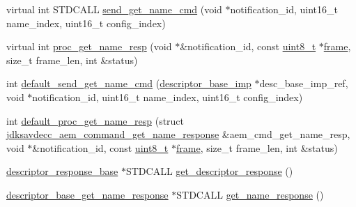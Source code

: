 \begin{DoxyCompactItemize}
virtual int S\+T\+D\+C\+A\+LL \hyperlink{classavdecc__lib_1_1descriptor__base__imp_a4e8ce103baabbd5fc07deabfb95f791a}{send\+\_\+get\+\_\+name\+\_\+cmd} (void $\ast$notification\+\_\+id, uint16\+\_\+t name\+\_\+index, uint16\+\_\+t config\+\_\+index)
\item 
virtual int \hyperlink{classavdecc__lib_1_1descriptor__base__imp_ac4e290a88039a8e4915f7b9f8738881f}{proc\+\_\+get\+\_\+name\+\_\+resp} (void $\ast$\&notification\+\_\+id, const \hyperlink{stdint_8h_aba7bc1797add20fe3efdf37ced1182c5}{uint8\+\_\+t} $\ast$\hyperlink{gst__avb__playbin_8c_ac8e710e0b5e994c0545d75d69868c6f0}{frame}, size\+\_\+t frame\+\_\+len, int \&status)
\item 
int \hyperlink{classavdecc__lib_1_1descriptor__base__imp_a92f2c88d261418872a496a8145800751}{default\+\_\+send\+\_\+get\+\_\+name\+\_\+cmd} (\hyperlink{classavdecc__lib_1_1descriptor__base__imp}{descriptor\+\_\+base\+\_\+imp} $\ast$desc\+\_\+base\+\_\+imp\+\_\+ref, void $\ast$notification\+\_\+id, uint16\+\_\+t name\+\_\+index, uint16\+\_\+t config\+\_\+index)
\item 
int \hyperlink{classavdecc__lib_1_1descriptor__base__imp_acc8b1c1591bd54bc9a2d21d4f0db2e86}{default\+\_\+proc\+\_\+get\+\_\+name\+\_\+resp} (struct \hyperlink{structjdksavdecc__aem__command__get__name__response}{jdksavdecc\+\_\+aem\+\_\+command\+\_\+get\+\_\+name\+\_\+response} \&aem\+\_\+cmd\+\_\+get\+\_\+name\+\_\+resp, void $\ast$\&notification\+\_\+id, const \hyperlink{stdint_8h_aba7bc1797add20fe3efdf37ced1182c5}{uint8\+\_\+t} $\ast$\hyperlink{gst__avb__playbin_8c_ac8e710e0b5e994c0545d75d69868c6f0}{frame}, size\+\_\+t frame\+\_\+len, int \&status)
\item 
\hyperlink{classavdecc__lib_1_1descriptor__response__base}{descriptor\+\_\+response\+\_\+base} $\ast$S\+T\+D\+C\+A\+LL \hyperlink{classavdecc__lib_1_1descriptor__base__imp_a8c64c9df60afbc144cf24eab5a42c009}{get\+\_\+descriptor\+\_\+response} ()
\item 
\hyperlink{classavdecc__lib_1_1descriptor__base__get__name__response}{descriptor\+\_\+base\+\_\+get\+\_\+name\+\_\+response} $\ast$S\+T\+D\+C\+A\+LL \hyperlink{classavdecc__lib_1_1descriptor__base__imp_abf130a286ee3ca9d1f41a7e2abbd0d33}{get\+\_\+name\+\_\+response} ()
\end{DoxyCompactItemize}
